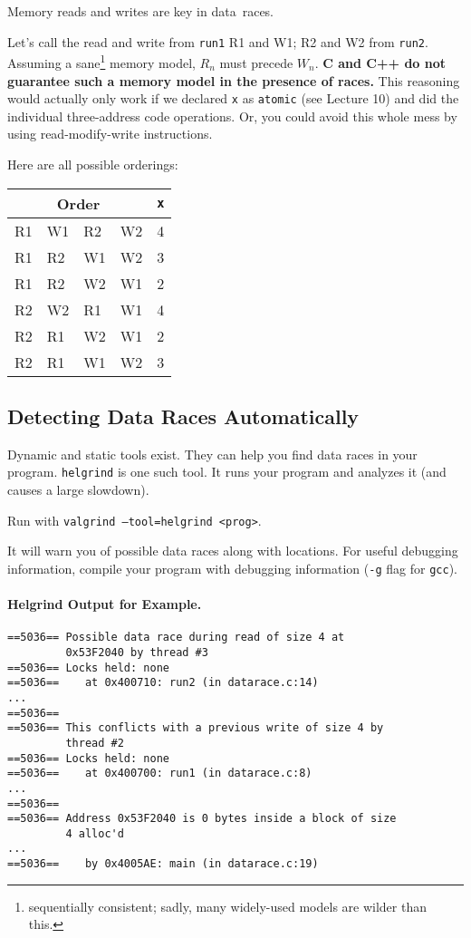 Memory reads and writes are key in data~races.

Let's call the read and write from {\tt run1} R1 and W1; R2 and W2
from {\tt run2}. Assuming a sane\footnote{sequentially consistent; sadly, many
widely-used models are wilder than this.}
memory model, $R_n$ must precede $W_n$. {\bf C and C++ do not guarantee
  such a memory model in the presence of races.} This reasoning would
actually only work if we declared {\tt x} as {\tt atomic}
(see Lecture 10) and did the
individual three-address code operations. Or, you could avoid this whole
mess by using read-modify-write instructions.

Here are all possible orderings:
  \begin{center}
    \begin{tabular}{llll|l}
\multicolumn{4}{c|}{Order} & {\tt *x}\\
\hline
R1 & W1 & R2 & W2 & 4 \\
R1 & R2 & W1 & W2 & 3 \\
R1 & R2 & W2 & W1 & 2 \\
R2 & W2 & R1 & W1 & 4 \\
R2 & R1 & W2 & W1 & 2 \\
R2 & R1 & W1 & W2 & 3 \\
    \end{tabular}
  \end{center}

\subsection*{Detecting Data Races Automatically}  
Dynamic and static tools exist. They can help you find data races in
your program. {\tt helgrind} is one such tool. It runs your program 
and analyzes it (and causes a large slowdown).

Run with {\tt valgrind --tool=helgrind <prog>}.

It will warn you of possible data races along with locations. For
useful debugging information, compile your program with debugging
information ({\tt -g} flag for {\tt gcc}).

\paragraph{Helgrind Output for Example.}
\begin{verbatim}
==5036== Possible data race during read of size 4 at
         0x53F2040 by thread #3
==5036== Locks held: none
==5036==    at 0x400710: run2 (in datarace.c:14)
...
==5036== 
==5036== This conflicts with a previous write of size 4 by
         thread #2
==5036== Locks held: none
==5036==    at 0x400700: run1 (in datarace.c:8)
...
==5036== 
==5036== Address 0x53F2040 is 0 bytes inside a block of size
         4 alloc'd
...
==5036==    by 0x4005AE: main (in datarace.c:19)
\end{verbatim}


